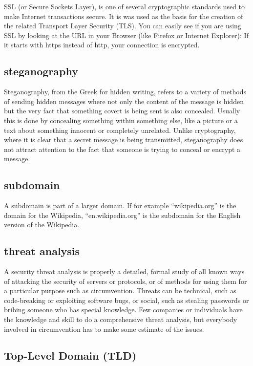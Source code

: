SSL (or Secure Sockets Layer), is one of several cryptographic standards
used to make Internet transactions secure. It is was used as the basis
for the creation of the related Transport Layer Security (TLS). You can
easily see if you are using SSL by looking at the URL in your Browser
(like Firefox or Internet Explorer): If it starts with https instead of
http, your connection is encrypted.

\subsection{steganography}

Steganography, from the Greek for hidden writing, refers to a variety of
methods of sending hidden messages where not only the content of the
message is hidden but the very fact that something covert is being sent
is also concealed. Usually this is done by concealing something within
something else, like a picture or a text about something innocent or
completely unrelated. Unlike cryptography, where it is clear that a
secret message is being transmitted, steganography does not attract
attention to the fact that someone is trying to conceal or encrypt a
message.

\subsection{subdomain}

A subdomain is part of a larger domain. If for example ``wikipedia.org''
is the domain for the Wikipedia, ``en.wikipedia.org'' is the subdomain
for the English version of the Wikipedia.

\subsection{threat analysis}

A security threat analysis is properly a detailed, formal study of all
known ways of attacking the security of servers or protocols, or of
methods for using them for a particular purpose such as circumvention.
Threats can be technical, such as code-breaking or exploiting software
bugs, or social, such as stealing passwords or bribing someone who has
special knowledge. Few companies or individuals have the knowledge and
skill to do a comprehensive threat analysis, but everybody involved in
circumvention has to make some estimate of the issues.

\subsection{Top-Level Domain (TLD)}

